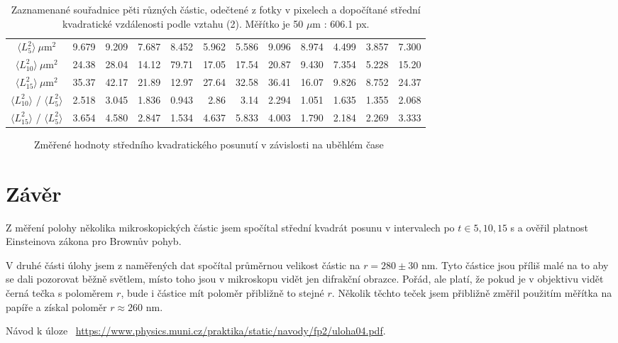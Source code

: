 \documentclass[a4paper,11pt]{article}
\begin{document}
\begin{table}[htpb]
\begin{tabular}{c | r r | r r | r r | r r | r r | c}
       $ \langle L_5^2  \rangle \ \mu \text{m}^2 $ & 9.679 & 9.209 & 7.687 & 8.452 & 5.962 & 5.586 & 9.096 & 8.974 & 4.499 & 3.857 & 7.300 \\
       $ \langle L_{10}^2  \rangle \ \mu \text{m}^2 $ & 24.38 & 28.04 & 14.12 & 79.71 & 17.05 & 17.54 & 20.87 & 9.430 & 7.354 & 5.228 & 15.20 \\
       $ \langle L_{15}^2  \rangle \ \mu \text{m}^2 $ & 35.37 & 42.17 & 21.89 & 12.97 & 27.64 & 32.58 & 36.41 & 16.07 & 9.826 & 8.752 & 24.37 \\\hline
       $ \langle L_{10}^2 \rangle $ / $ \langle L_5^2 \rangle $ & 2.518 & 3.045 & 1.836 & 0.943 & 2.86 & 3.14 & 2.294 & 1.051 & 1.635 & 1.355 & 2.068 \\
       $ \langle L_{15}^2 \rangle $ / $ \langle L_5^2 \rangle $ & 3.654 & 4.580 & 2.847 & 1.534 & 4.637 & 5.833 & 4.003 & 1.790 & 2.184 & 2.269 & 3.333 \\
       \hline\hline
\end{tabular}
\caption{Zaznamenané souřadnice pěti různých částic, odečtené z fotky v pixelech a dopočítané střední kvadratické vzdálenosti podle vztahu (2). Měřítko je 50 $ \mu \text{m} $ : 606.1 px. }
\end{table}

\begin{figure}[htpb]
    \centering
    
    \captionsetup{type=graph}
    \caption{Změřené hodnoty středního kvadratického posunutí v závislosti na uběhlém čase }
\end{figure}

\section{Závěr}

Z měření polohy několika mikroskopických částic jsem spočítal střední kvadrát posunu v intervalech po $ t \in {5, 10, 15} $ s a ověřil platnost Einsteinova zákona pro Brownův pohyb.

V druhé části úlohy jsem z naměřených dat spočítal průměrnou velikost částic na $ r = 280 \pm 30 $ nm. Tyto částice jsou příliš malé na to aby se dali pozorovat běžně světlem, místo toho jsou v mikroskopu vidět jen difrakční obrazce. Pořád, ale platí, že pokud je v objektivu vidět černá tečka s poloměrem $ r $, bude i částice mít poloměr přibližně to stejné $ r $. Několik těchto teček jsem přibližně změřil použitím měřítka na papíře a získal poloměr $ r \approx 260 $ nm.

\begin{thebibliography}{0}
 Návod k úloze ~\url{https://www.physics.muni.cz/praktika/static/navody/fp2/uloha04.pdf}.   
\end{thebibliography}
\end{document}
